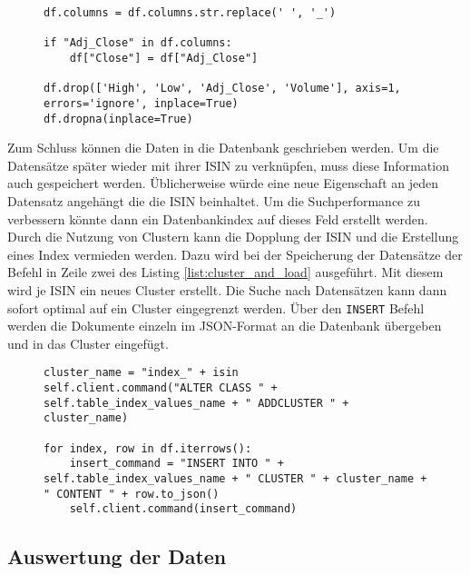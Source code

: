 \begin{figure}[!htb]
    \begin{lstlisting}[caption=Transformation eines DataFrames, label=list:transformation]
df.columns = df.columns.str.replace(' ', '_')

if "Adj_Close" in df.columns:
    df["Close"] = df["Adj_Close"]

df.drop(['High', 'Low', 'Adj_Close', 'Volume'], axis=1, errors='ignore', inplace=True)
df.dropna(inplace=True)
    \end{lstlisting}
\end{figure}

Zum Schluss können die Daten in die Datenbank geschrieben werden. Um die Datensätze später wieder mit ihrer \gls{ISIN} zu verknüpfen, muss diese Information auch gespeichert werden. Üblicherweise würde eine neue Eigenschaft an jeden Datensatz angehängt die die \gls{ISIN} beinhaltet. Um die Suchperformance zu verbessern könnte dann ein Datenbankindex auf dieses Feld erstellt werden. Durch die Nutzung von Clustern kann die Dopplung der \gls{ISIN} und die Erstellung eines Index vermieden werden. Dazu wird bei der Speicherung der Datensätze der Befehl in Zeile zwei des Listing \ref{list:cluster_and_load} ausgeführt. Mit diesem wird je \gls{ISIN} ein neues Cluster erstellt. Die Suche nach Datensätzen kann dann sofort optimal auf ein Cluster eingegrenzt werden. Über den \texttt{INSERT} Befehl werden die Dokumente einzeln im \gls{JSON}-Format an die Datenbank übergeben und in das Cluster eingefügt.

\begin{figure}[!htb]
    \begin{lstlisting}[caption=Erstellung eines Clusters und Einfügen der Datensätze, label=list:cluster_and_load]
cluster_name = "index_" + isin
self.client.command("ALTER CLASS " + self.table_index_values_name + " ADDCLUSTER " + cluster_name)

for index, row in df.iterrows():
    insert_command = "INSERT INTO " + self.table_index_values_name + " CLUSTER " + cluster_name + " CONTENT " + row.to_json()
    self.client.command(insert_command)
    \end{lstlisting}
\end{figure}

\subsection{Auswertung der Daten}

\clearpage